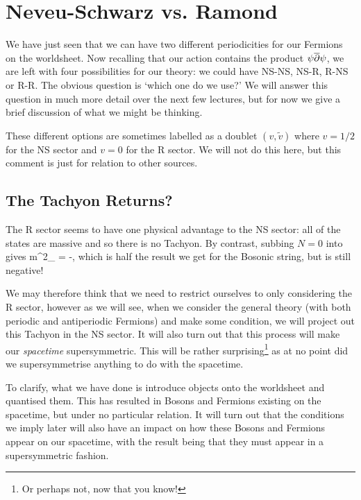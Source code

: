 \section{Neveu-Schwarz vs. Ramond}

We have just seen that we can have two different periodicities for our Fermions on the worldsheet. Now recalling that our action contains the product $\psi\overline{\partial}\psi$, we are left with four possibilities for our theory: we could have NS-NS, NS-R, R-NS or R-R. The obvious question is `which one do we use?' We will answer this question in much more detail over the next few lectures, but for now we give a brief discussion of what we might be thinking. 

\br 
    These different options are sometimes labelled as a doublet $(v,\widetilde{v})$ where $v=1/2$ for the NS sector and $v=0$ for the R sector. We will not do this here, but this comment is just for relation to other sources.
\er 

\subsection{The Tachyon Returns?}

The R sector seems to have one physical advantage to the NS sector: all of the states are massive and so there is no Tachyon. By contrast, subbing $N=0$ into  gives 
\be 
    m^2_{} = -,
\ee 
which is half the result we get for the Bosonic string, but is still negative! 

We may therefore think that we need to restrict ourselves to only considering the R sector, however as we will see, when we consider the general theory (with both periodic and antiperiodic Fermions) and make some condition, we will project out this Tachyon in the NS sector. It will also turn out that this process will make our \textit{spacetime} supersymmetric. This will be rather surprising\footnote{Or perhaps not, now that you know!} as at no point did we supersymmetrise anything to do with the spacetime.

To clarify, what we have done is introduce objects onto the worldsheet and quantised them. This has resulted in Bosons and Fermions existing on the spacetime, but under no particular relation. It will turn out that the conditions we imply later will also have an impact on how these Bosons and Fermions appear on our spacetime, with the result being that they must appear in a supersymmetric fashion.


